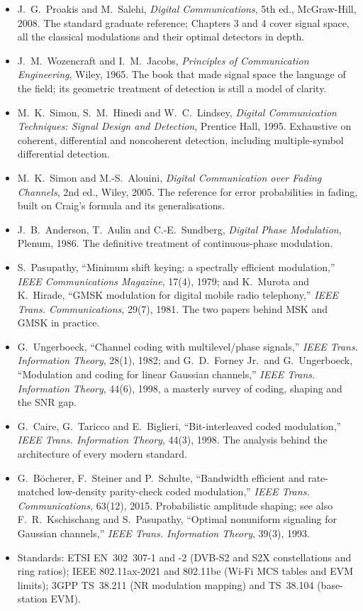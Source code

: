 \furtherreading
\begin{itemize}
\item J.~G.~Proakis and M.~Salehi, \emph{Digital Communications}, 5th ed., McGraw-Hill, 2008. The
standard graduate reference; Chapters 3 and 4 cover signal space, all the classical modulations and
their optimal detectors in depth.
\item J.~M.~Wozencraft and I.~M.~Jacobs, \emph{Principles of Communication Engineering}, Wiley, 1965.
The book that made signal space the language of the field; its geometric treatment of detection is
still a model of clarity.
\item M.~K.~Simon, S.~M.~Hinedi and W.~C.~Lindsey, \emph{Digital Communication Techniques: Signal
Design and Detection}, Prentice Hall, 1995. Exhaustive on coherent, differential and noncoherent
detection, including multiple-symbol differential detection.
\item M.~K.~Simon and M.-S.~Alouini, \emph{Digital Communication over Fading Channels}, 2nd ed.,
Wiley, 2005. The reference for error probabilities in fading, built on Craig's formula and its
generalisations.
\item J.~B.~Anderson, T.~Aulin and C.-E.~Sundberg, \emph{Digital Phase Modulation}, Plenum, 1986.
The definitive treatment of continuous-phase modulation.
\item S.~Pasupathy, ``Minimum shift keying: a spectrally efficient modulation,'' \emph{IEEE
Communications Magazine}, 17(4), 1979; and K.~Murota and K.~Hirade, ``GMSK modulation for digital
mobile radio telephony,'' \emph{IEEE Trans. Communications}, 29(7), 1981. The two papers behind MSK
and GMSK in practice.
\item G.~Ungerboeck, ``Channel coding with multilevel/phase signals,'' \emph{IEEE Trans. Information
Theory}, 28(1), 1982; and G.~D.~Forney Jr.\ and G.~Ungerboeck, ``Modulation and coding for linear
Gaussian channels,'' \emph{IEEE Trans. Information Theory}, 44(6), 1998, a masterly survey of
coding, shaping and the SNR gap.
\item G.~Caire, G.~Taricco and E.~Biglieri, ``Bit-interleaved coded modulation,'' \emph{IEEE Trans.
Information Theory}, 44(3), 1998. The analysis behind the architecture of every modern standard.
\item G.~B\"ocherer, F.~Steiner and P.~Schulte, ``Bandwidth efficient and rate-matched low-density
parity-check coded modulation,'' \emph{IEEE Trans. Communications}, 63(12), 2015. Probabilistic
amplitude shaping; see also F.~R.~Kschischang and S.~Pasupathy, ``Optimal nonuniform signaling for
Gaussian channels,'' \emph{IEEE Trans. Information Theory}, 39(3), 1993.
\item Standards: ETSI EN~302~307-1 and -2 (DVB-S2 and S2X constellations and ring ratios); IEEE
802.11ax-2021 and 802.11be (Wi-Fi MCS tables and EVM limits); 3GPP TS~38.211 (NR modulation mapping)
and TS~38.104 (base-station EVM).
\end{itemize}
